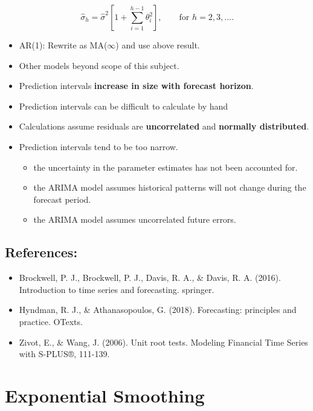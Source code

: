 \documentclass[]{book}
\providecommand{\tightlist}{%
  \setlength{\itemsep}{0pt}\setlength{\parskip}{0pt}}
\begin{document}
\[\hat{\sigma}_h = \hat{\sigma}^2 \left[ 1 + \sum_{i=1}^{h-1} \theta_i^2\right], \qquad\text{for~} h=2,3,\dots.\]

\begin{itemize}
\tightlist
\item
  AR(1): Rewrite as MA(\(\infty\)) and use above result.
\item
  Other models beyond scope of this subject.
\item
  Prediction intervals \textbf{increase in size with forecast horizon}.
\item
  Prediction intervals can be difficult to calculate by hand
\item
  Calculations assume residuals are \textbf{uncorrelated} and \textbf{normally distributed}.
\item
  Prediction intervals tend to be too narrow.

  \begin{itemize}
  \tightlist
  \item
    the uncertainty in the parameter estimates has not been accounted for.
  \item
    the ARIMA model assumes historical patterns will not change during the forecast period.
  \item
    the ARIMA model assumes uncorrelated future errors.
  \end{itemize}
\end{itemize}

\hypertarget{references}{%
\section{References:}\label{references}}

\begin{itemize}
\item
  Brockwell, P. J., Brockwell, P. J., Davis, R. A., \& Davis, R. A. (2016). Introduction to time series and forecasting. springer.
\item
  Hyndman, R. J., \& Athanasopoulos, G. (2018). Forecasting: principles and practice. OTexts.
\item
  Zivot, E., \& Wang, J. (2006). Unit root tests. Modeling Financial Time Series with S-PLUS®, 111-139.
\end{itemize}

\hypertarget{exponential-smoothing}{%
\chapter{Exponential Smoothing}\label{exponential-smoothing}}
\end{document}
